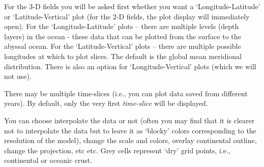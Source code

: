 \documentclass[11pt,fleqn]{book} %
\begin{document}
For the 3-D fields you will be asked first whether you want a ‘\textsf{\footnotesize \footnotesize Longitude-Latitude}’ or ‘\textsf{\footnotesize Latitude-Vertical}’ plot (for the 2-D fields, the plot display will immediately open).
For the ‘\textsf{\footnotesize Longitude-Latitude}’ plots – there are multiple levels (depth layers) in the ocean - these data that can be plotted from the surface to the abyssal ocean. For the ‘\textsf{\footnotesize Latitude-Vertical}' plots – there are multiple possible longitudes at which to plot slices. The default is the global mean meridional distribution. There is also an option for ‘\textsf{\footnotesize Longitude-Vertical}' plots (which we will not use).

There may be multiple time-slices (i.e., you can plot data saved from different years). By default, only the very first \textit{time-slice} will be displayed.

You can choose interpolate the data or not (often you may find that it is clearer not to interpolate the data but to leave it as ‘blocky’ colors corresponding to the resolution of the model), change the scale and colors, overlay continental outline, change the projection, etc etc. Grey cells represent ‘dry’ grid points, i.e., continental or oceanic crust.
\end{document}
